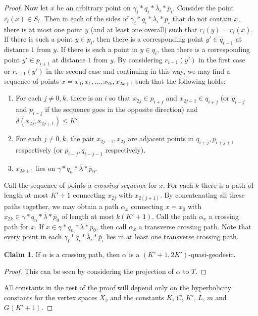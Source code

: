 \documentclass[11pt, a4paper]{amsart}
\theoremstyle{definition}
\newtheorem{claim}[theorem]{Claim}
\begin{document}
\begin{proof}
Now let $x$ be an arbitrary point on $\gamma_i*q_i*\overline{\lambda}_i*\overline{p}_i$. Consider the point $r_i(x)\in S_i$. Then in each of the sides of $\gamma_i*q_i*\overline{\lambda}_i*\overline{p}_i$ that do not contain $x$, there is at most one point $y$ (and at least one overall) such that $r_i(y) = r_i(x)$. If there is such a point $y\in p_i$, then there is a corresponding point $y'\in q_{i-1}$ at distance $1$ from $y$. If there is such a point in $y\in q_i$, then there is a corresponding point $y'\in p_{i+1}$ at distance $1$ from $y$. By considering $r_{i-1}(y')$ in the first case or $r_{i+1}(y')$ in the second case and continuing in this way, we may find a sequence of points $x = x_0, x_1, \ldots, x_{2k}, x_{2k+1}$ such that the following holds:
\begin{enumerate}
\item For each $j\neq 0, k$, there is an $i$ so that $x_{2j}\in p_{i+j}$ and $x_{2j+1}\in q_{i+j}$ (or $q_{i-j}$ and $p_{i-j}$ if the sequence goes in the opposite direction) and $d(x_{2j}, x_{2j+1})\leqslant K'$.
\item For each $j\neq 0, k$, the pair $x_{2j-1}, x_{2j}$ are adjacent points in $q_{i+j}, p_{i +j+1}$ respectively (or $p_{i-j}, q_{i-j-1}$ respectively).
\item $x_{2k+1}$ lies on $\gamma*q_n*\overline{\lambda}*\overline{p}_0$.
\end{enumerate}
Call the sequence of points a \emph{crossing sequence} for $x$. For each $k$ there is a path of length at most $K'+1$ connecting $x_{2j}$ with $x_{2(j+1)}$. By concatenating all these paths together, we may obtain a path $\alpha_x$ connecting $x = x_0$ with $x_{2k}\in \gamma*q_n*\overline{\lambda}*\overline{p}_0$ of length at most $k(K'+1)$. Call the path $\alpha_x$ a crossing path for $x$. If $x\in \gamma*q_n*\overline{\lambda}*\overline{p}_0$, then call $\alpha_x$ a transverse crossing path. Note that every point in each $\gamma_i*q_i*\overline{\lambda}_i*\overline{p}_i$ lies in at least one transverse crossing path.

\begin{claim}
\label{claim:qg}
If $\alpha$ is a crossing path, then $\alpha$ is a $(K'+1, 2K')$-quasi-geodesic.
\end{claim}

\begin{proof}
This can be seen by considering the projection of $\alpha$ to $T$.
\end{proof}

All constants in the rest of the proof will depend only on the hyperbolicity constants for the vertex spaces $X_v$ and the constants $K$, $C$, $K'$, $L$, $m$ and $G(K'+1)$.


\end{proof}
\end{document}
